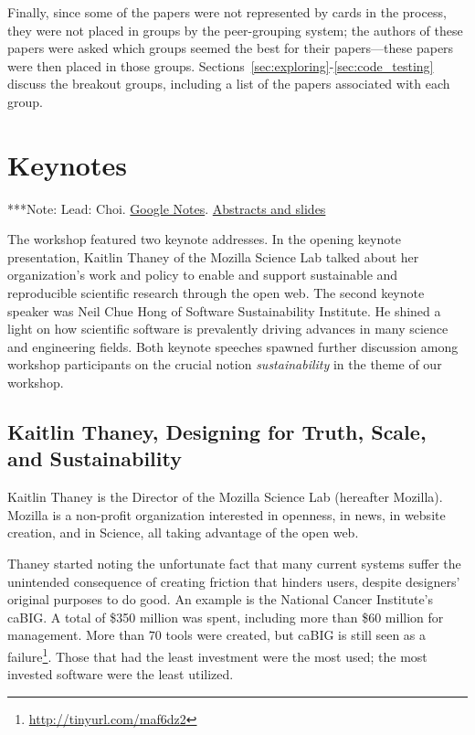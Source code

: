 \documentclass[11pt, oneside]{amsart}
\newcommand{\note}[1]{ {\textcolor{blueish}    { ***Note:      #1 }}}
\begin{document}
Finally, since some of the papers were not represented by cards in the process,
they were not placed in groups by the peer-grouping system; the authors of
these papers were asked which groups seemed the best for their papers---these
papers were then placed in those groups. Sections~\ref{sec:exploring}-\ref{sec:code_testing}
discuss the breakout groups, including a list of the papers associated with each
group.


\section{Keynotes} \label{sec:keynotes}

\note{Lead: Choi. \href{http://tinyurl.com/q6ew45v}{Google Notes}.
\href{http://tinyurl.com/mnenzms}{Abstracts and slides}}

The workshop featured two keynote addresses. In the opening keynote
presentation, Kaitlin Thaney of the Mozilla Science Lab talked about her
organization's work and policy to enable and support sustainable and
reproducible scientific research through the open web. The second keynote
speaker was Neil Chue Hong of Software Sustainability Institute. He shined a
light on how scientific software is prevalently driving advances in many science
and engineering fields. Both keynote speeches spawned further discussion among
workshop participants on the crucial notion \emph{sustainability} in the theme of
our workshop.

\subsection{Kaitlin Thaney, Designing for Truth, Scale, and Sustainability}
\label{keynote1}

Kaitlin Thaney is the Director of the Mozilla Science Lab (hereafter Mozilla).
Mozilla is a non-profit organization interested in openness, in news, in website
creation, and in Science, all taking advantage of the open web.

Thaney started noting the unfortunate fact that many current systems suffer the
unintended consequence of creating friction that hinders users, despite
designers' original purposes to do good. An example is the National Cancer
Institute's caBIG. A total of \$350 million was spent, including more than \$60
million for management. More than $70$ tools were created, but caBIG is still
seen as a failure\footnote{\url{http://tinyurl.com/maf6dz2}}. Those that had the
least investment were the most used; the most invested software were the least
utilized.
\end{document}
